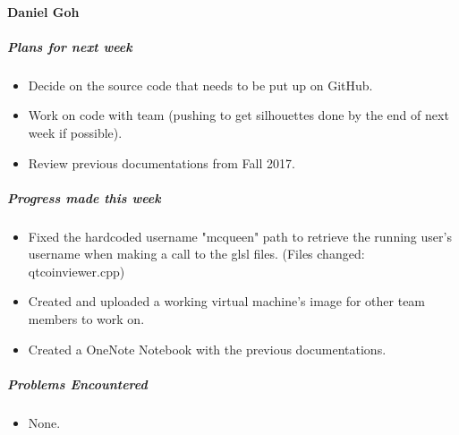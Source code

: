 {\vspace{3mm}
\paragraph{Daniel Goh}
\subparagraph{Plans for next week}
\begin{itemize}
  \item Decide on the source code that needs to be put up on GitHub.
  \item Work on code with team (pushing to get silhouettes done by the end of next week if possible).
  \item Review previous documentations from Fall 2017.
\end{itemize}

\subparagraph{Progress made this week}
\begin{itemize}
  \item Fixed the hardcoded username "mcqueen" path to retrieve the running user's username when making a call to the glsl files. (Files changed: qtcoinviewer.cpp)
  \item Created and uploaded a working virtual machine's image for other team members to work on.
  \item Created a OneNote Notebook with the previous documentations.
\end{itemize}

\subparagraph{Problems Encountered}
\begin{itemize}
  \item None.
\end{itemize}

}

\newpage

